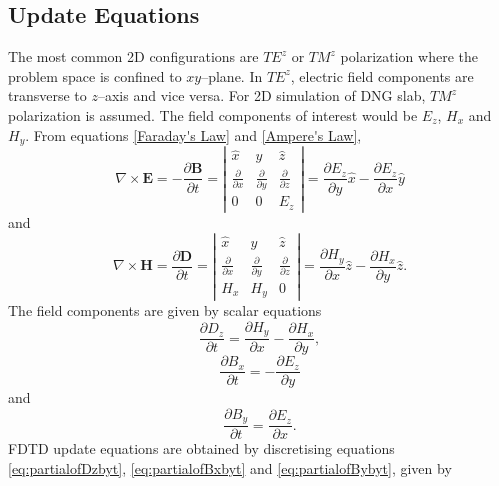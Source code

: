 \subsection{Update Equations}
The most common 2D configurations are $TE^z$ or $TM^z$ polarization where the problem space is confined to $xy$--plane. In $TE^z$, electric field components are transverse to $z$--axis and vice versa. For 2D simulation of DNG slab, $TM^z$ polarization is assumed. The field components of interest would be $E_z$, $H_x$ and $H_y$. From equations \ref{Faraday's Law} and \ref{Ampere's Law},
\begin{equation}
\nabla \times \textbf{E} = -\dfrac{\partial \textbf{B}}{\partial t} = \left| \begin{array}{ccc} \hat{x} & \hat{y} & \hat{z} \\ \frac{\partial}{\partial x} & \frac{\partial}{\partial y} & \frac{\partial}{\partial z} \\ 0 & 0 & E_z \end{array} \right| = \dfrac{\partial E_z}{\partial y} \hat{x} - \dfrac{\partial E_z}{\partial x} \hat{y}
\label{eq:Faraday'sLawExpansionTMz}
\end{equation}
and
\begin{equation}
\nabla \times \textbf{H} = \dfrac{\partial \textbf{D}}{\partial t} = \left| \begin{array}{ccc} \hat{x} & \hat{y} & \hat{z} \\ \frac{\partial}{\partial x} & \frac{\partial}{\partial y} & \frac{\partial}{\partial z} \\ H_x & H_y & 0 \end{array} \right| = \dfrac{\partial H_y}{\partial x} \hat{z} - \dfrac{\partial H_x}{\partial y} \hat{z}.
\label{eq:Ampere'sLawExpansionTMz}
\end{equation}
The field components are given by scalar equations
\begin{equation}
\dfrac{\partial D_z}{\partial t} = \dfrac{\partial H_y}{\partial x} - \dfrac{\partial H_x}{\partial y},
\label{eq:partialofDzbyt}
\end{equation}
\begin{equation}
\dfrac{\partial B_x}{\partial t} = -\dfrac{\partial E_z}{\partial y}
\label{eq:partialofBxbyt}
\end{equation}
and
\begin{equation}
\dfrac{\partial B_y}{\partial t} = \dfrac{\partial E_z}{\partial x}.
\label{eq:partialofBybyt}
\end{equation}
FDTD update equations are obtained by discretising equations \ref{eq:partialofDzbyt}, \ref{eq:partialofBxbyt} and \ref{eq:partialofBybyt}, given by
